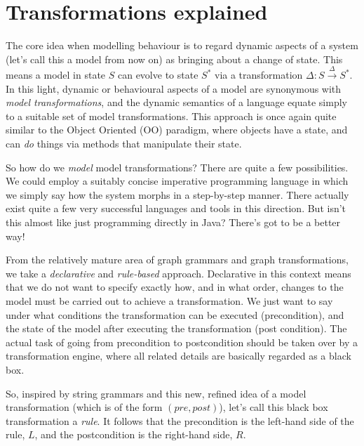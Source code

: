 \newpage
\hypertarget{explanation}{}
\section{Transformations explained}
\genHeader

The core idea when modelling behaviour is to regard dynamic aspects of a system (let's call this a model from now on) as bringing about a change of state.
This means a model in state $S$ can evolve to state $S^*$ via a transformation $\Delta: S \stackrel{\Delta}{\rightarrow}S^*$. In this light, dynamic or
behavioural aspects of a model are synonymous with \emph{model transformations}, and the dynamic semantics of a language equate simply to a suitable set of
model transformations. This approach is once again quite similar to the Object Oriented (OO) paradigm, where objects have a state, and can \emph{do} things via
methods that manipulate their state.

So how do we \emph{model} model transformations?  There are quite a few possibilities. We could employ a suitably concise imperative programming language in
which we simply say how the system morphs in a step-by-step manner. There actually exist quite a few very successful languages and tools in this direction. But
isn't this almost like just programming directly in Java? There's got to be a better way! 

From the relatively mature area of graph grammars and graph transformations, we take a \emph{declarative} and \emph{rule-based} approach. Declarative in this
context means that we do not want to specify exactly how, and in what order, changes to the model must be carried out to achieve a transformation. We just want
to say under what conditions the transformation can be executed (precondition), and the state of the model after executing the transformation (post condition).
The actual task of going from precondition to postcondition should be taken over by a transformation engine, where all related details are basically regarded as
a black box.

So, inspired by string grammars and this new, refined idea of a model transformation (which is of the form $(pre, post)$), let's call this black box
transformation a \emph{rule}. It follows that the precondition is the left-hand side of the rule, $L$, and the postcondition is the right-hand side, $R$.

